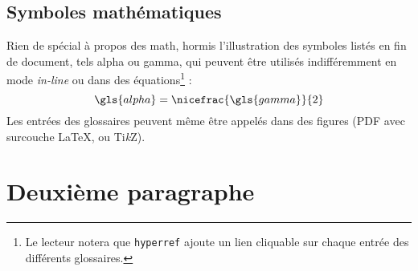 	\subsection{Symboles mathématiques}
	Rien de spécial à propos des math, hormis l'illustration des symboles listés en fin de document, tels \gls{alpha} ou \gls{gamma}, qui peuvent être utilisés indifféremment en mode \emph{in-line} ou dans des équations\footnote{Le lecteur notera que \texttt{hyperref} ajoute un lien cliquable sur chaque entrée des différents glossaires.} :
	\begin{equation}
		\gls{alpha}=\nicefrac{\gls{gamma}}{2}
		\label{eq:alphagamma}
	\end{equation}
Les entrées des glossaires peuvent même être appelés dans des figures (PDF avec surcouche \LaTeX, ou Ti\textit{k}Z).
	

\section{Deuxième paragraphe}
\blindtext


